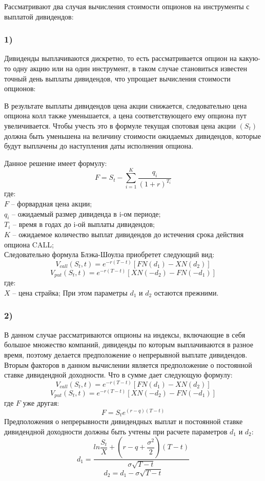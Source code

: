 \documentclass[a4paper]{article}
\begin{document}
Рассматривают два случая вычисления стоимости опционов на инструменты с выплатой дивидендов:
\subsubsection*{1)}
Дивиденды выплачиваются дискретно, то есть рассматривается опцион на какую-то одну акцию или на один инструмент, в таком случае становиться известен точный день выплаты дивидендов, что упрощает вычисления стоимости опционов:

В результате выплаты дивидендов цена акции снижается, следовательно цена опциона колл также уменьшается, а цена соответствующего ему опциона пут увеличивается. Чтобы учесть это в формуле текущая спотовая цена акции $(S_t)$ должна быть уменьшена на величину стоимости ожидаемых дивидендов, которые будут выплачены до наступления даты исполнения опциона.

Данное решение имеет формулу:
\[F = S_t - \sum^K_{i = 1} \dfrac{q_i}{(1 + r)^{T_i}}\]
где: \\
$F$ -- форвардная цена акции; \\
$q_i$ -- ожидаемый размер дивиденда в i-ом периоде; \\
$T_i$ -- время в годах до i-ой выплаты дивидендов; \\
$K$ -- ожидаемое количество выплат дивидендов до истечения срока действия опциона CALL; \\
Следовательно формула Блэка-Шоулза приобретет следующий вид:
\[V_{call}(S_t, t) = e^{-r(T - t)} \left[ F N(d_1) - X N(d_2) \right]\]
\[V_{put}(S_t, t) = e^{-r(T - t)} \left[ X N(-d_2) - F N(-d_1) \right]\]
где:\\
$X$ -- цена страйка; При этом параметры $d_1$ и $d_2$ остаются прежними.
\subsubsection*{2)}
В данном случае рассматриваются опционы на индексы, включающие в себя большое множество компаний, дивиденды по которым выплачиваются в разное время, поэтому делается предположение о непрерывной выплате дивидендов. Вторым факторов в данном вычислении является предположение о постоянной ставке дивидендной доходности. Что в сумме дает следующую формулу:
\[V_{call}(S_t, t) = e^{-r(T - t)} \left[ F N(d_1) - X N(d_2) \right]\]
\[V_{put}(S_t, t) = e^{-r(T - t)} \left[ X N(-d_2) - F N(-d_1) \right]\]
где $F$ уже другая:
\[F = S_t e^{(r - q) (T- t)}\]
Предположения о непрерывности дивидендных выплат и постоянной ставке дивидендной доходности должны быть учтены при расчете параметров $d_1$ и $d_2$:
\[d_1 = \dfrac{ln \dfrac{S_t}{X} + \left(r - q + \dfrac{\sigma^2}{2} \right) (T - t)}{\sigma \sqrt{T - t}}\]
\[d_2 = d_1 - \sigma \sqrt{T - t}\]
\end{document}

